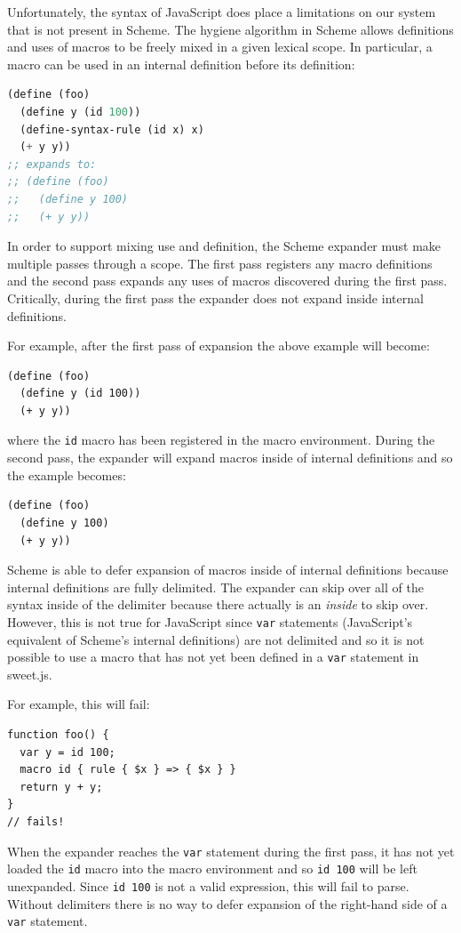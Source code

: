 \documentclass[preprint,10pt]{sigplanconf}
\begin{document}
Unfortunately, the syntax of JavaScript does place a limitations on
our system that is not present in Scheme. The hygiene algorithm in
Scheme allows definitions and uses of macros to be freely mixed in a
given lexical scope. In particular, a macro can be used in an internal
definition before its definition:

\begin{lstlisting}[language=lisp]
(define (foo)
  (define y (id 100))
  (define-syntax-rule (id x) x)
  (+ y y))
;; expands to:
;; (define (foo)
;;   (define y 100)
;;   (+ y y))
\end{lstlisting}

In order to support mixing use and definition, the Scheme expander
must make multiple passes through a scope. The first pass registers
any macro definitions and the second pass expands any uses of macros
discovered during the first pass. Critically, during the first
pass the expander does not expand inside internal definitions.

For example, after the first pass of expansion the above example will become:
\begin{lstlisting}
(define (foo)
  (define y (id 100))
  (+ y y))
\end{lstlisting}
where the \verb!id! macro has been registered in the macro
environment. During the second pass, the expander will expand macros
inside of internal definitions and so the example becomes:
\begin{lstlisting}
(define (foo)
  (define y 100)
  (+ y y))
\end{lstlisting}

Scheme is able to defer expansion of macros inside of internal
definitions because internal definitions are fully delimited. The
expander can skip over all of the syntax inside of the delimiter
because there actually is an \emph{inside} to skip over. However, this
is not true for JavaScript since \verb!var! statements
(JavaScript's equivalent of Scheme's internal definitions) are not
delimited and so it is not possible to use a macro that has not yet
been defined in a \verb!var! statement in sweet.js.

For example, this will fail:

\begin{lstlisting}
function foo() {
  var y = id 100;
  macro id { rule { $x } => { $x } }
  return y + y;
}
// fails!
\end{lstlisting}
When the expander reaches the \verb!var! statement during the
first pass, it has not yet loaded the \verb!id! macro into the
macro environment and so \verb!id 100! will be left unexpanded.
Since \verb!id 100! is not a valid expression, this will fail to
parse.
Without delimiters there is no way to defer expansion of the
right-hand side of a \verb!var! statement.
\end{document}

